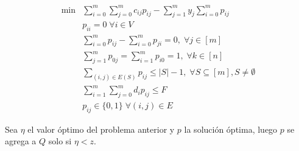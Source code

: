 \documentclass[10pt]{article}
\theoremstyle{plain}
\theoremstyle{definition}
\begin{document}
\begin{itemize}
\begin{align}
    \min & \sum_{i=0}^{m}\sum_{j=0}^{m}c_{ij}p_{ij}-\sum_{j=1}^{m}y_{j}\sum_{i=0}^{m}p_{ij}\nonumber\\
    & p_{ii}=0 \; \forall i \in V\\
    & \sum_{i=0}^{m}p_{ij} - \sum_{i=0}^{m}p_{ji} = 0,\; \forall j \in [m]\\
    & \sum_{j=1}^{m}p_{0j}=\sum_{i=1}^{m}p_{i0}=1, \; \forall k \in [n]\\
    & \sum_{(i,j)\in E(S)}p_{ij}\leq |S|-1, \; \forall S\subseteq [m], S\neq\emptyset\\
    & \sum_{i=1}^{m}\sum_{j=0}^{m} d_{i}p_{ij}\leq F\\
    & p_{ij}\in\{0,1\} \;\forall (i,j) \in E\nonumber
\end{align}
\end{itemize}

Sea $\eta$ el valor óptimo del problema anterior y $p$ la solución óptima, luego $p$ se agrega a $Q$ solo si $\eta<z$. 
\end{document}
